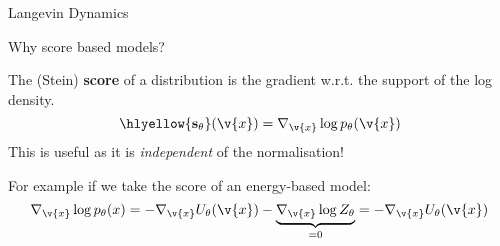 \begin{frame}{Langevin Dynamics}
    \centering
\end{frame}


\begin{frame}{Why score based models?}

The (Stein) \textbf{score} of a distribution is the gradient w.r.t. the support of the log density. 
\begin{equation}
    \hlyellow{\mathbf{s}_\theta}(\v{x}) = {\nabla_{\v{x}} \log p_\theta(\v{x})}
\end{equation}
This is useful as it is \textit{independent} of the normalisation!

\pause
For example if we take the score of an energy-based model:
\begin{equation}
   {\nabla_{\v{x}} \log p_\theta(x)} = -\nabla_{\v{x}} U_\theta(\v{x}) - \underbrace{\nabla_{\v{x}} \log Z_\theta}_{=0} = -\nabla_{\v{x}} U_\theta(\v{x})
\end{equation}
\vspace{-1em}
\begin{figure}
    \hspace{2em}
\end{figure}

\end{frame}


